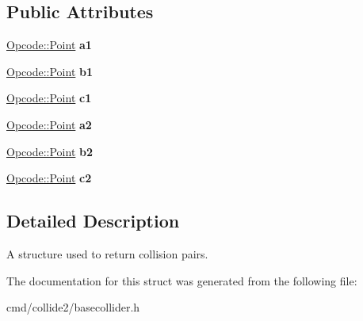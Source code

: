 \subsection*{Public Attributes}
\begin{DoxyCompactItemize}
\item 
\hyperlink{classOpcode_1_1Point}{Opcode\+::\+Point} {\bfseries a1}\hypertarget{structcsCollisionPair_aa0eb59b7c1fcf1426dfd96fa4012c626}{}\label{structcsCollisionPair_aa0eb59b7c1fcf1426dfd96fa4012c626}

\item 
\hyperlink{classOpcode_1_1Point}{Opcode\+::\+Point} {\bfseries b1}\hypertarget{structcsCollisionPair_ae9fbac9823f844e7d0b35484cee53159}{}\label{structcsCollisionPair_ae9fbac9823f844e7d0b35484cee53159}

\item 
\hyperlink{classOpcode_1_1Point}{Opcode\+::\+Point} {\bfseries c1}\hypertarget{structcsCollisionPair_a27509240266e945231b13a3bdf6ed663}{}\label{structcsCollisionPair_a27509240266e945231b13a3bdf6ed663}

\item 
\hyperlink{classOpcode_1_1Point}{Opcode\+::\+Point} {\bfseries a2}\hypertarget{structcsCollisionPair_a1e2a4a432061b69b9f9a188248e5141d}{}\label{structcsCollisionPair_a1e2a4a432061b69b9f9a188248e5141d}

\item 
\hyperlink{classOpcode_1_1Point}{Opcode\+::\+Point} {\bfseries b2}\hypertarget{structcsCollisionPair_a728615d064b058e4b265e87e6e5ae8a7}{}\label{structcsCollisionPair_a728615d064b058e4b265e87e6e5ae8a7}

\item 
\hyperlink{classOpcode_1_1Point}{Opcode\+::\+Point} {\bfseries c2}\hypertarget{structcsCollisionPair_a1aa1f8b3d0d48cb9fc489c1c03ae13fc}{}\label{structcsCollisionPair_a1aa1f8b3d0d48cb9fc489c1c03ae13fc}

\end{DoxyCompactItemize}


\subsection{Detailed Description}
A structure used to return collision pairs. 

The documentation for this struct was generated from the following file\+:\begin{DoxyCompactItemize}
\item 
cmd/collide2/basecollider.\+h\end{DoxyCompactItemize}
